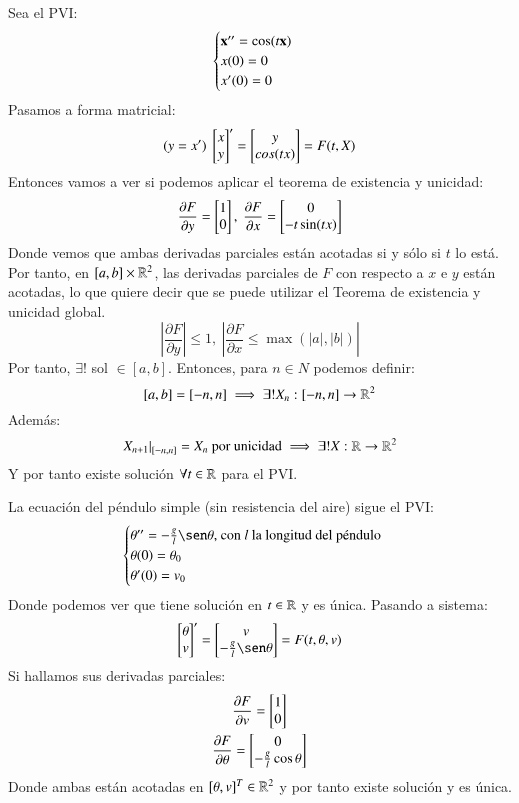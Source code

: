 \begin{eg}[Aplicación del teorema de existencia y unicidad en $\mbf{x}'' = \cos(t\mbf{x})$]
    Sea el PVI:
    $$
        \begin{cases}
            \mathbf{x''} = \cos(t\mathbf{x})\\
            x(0) = 0\\
            x'(0) = 0
        \end{cases}
    $$
    Pasamos a forma matricial:
    $$
        (y = x')\ \mx{x\\y}' = \mx{y\\ cos(tx)} = F(t, X)
    $$
    Entonces vamos a ver si podemos aplicar el teorema de existencia y unicidad:
    $$
        \frac{\partial F}{\partial y} = \mx{1\\0},\ \frac{\partial F}{\partial x} = \mx{0\\ -t\sin(tx)}
    $$
    Donde vemos que ambas derivadas parciales están acotadas si y sólo si $t$ lo está. Por tanto, en $[a, b] \times \mathbb{R}^2$, las derivadas parciales de $F$ con respecto a $x$ e $y$ están acotadas, lo que quiere decir que se puede utilizar el Teorema de existencia y unicidad global.
    $$
        \left| \frac{\partial F}{\partial y} \right| \leq 1,\ \left| \frac{\partial F}{\partial x} \leq \max(|a|, |b|)  \right|
    $$
    Por tanto, $\exists ! $ sol $ \in [a, b]$. Entonces, para $n \in N$ podemos definir:
    $$
        [a, b] = [-n, n] \implies \exists ! X_n: [-n, n] \to \mathbb{R}^2
    $$
    Además:
    $$
        \left. X_{n+1}\right|_{[-n, n]} = X_n \text{ por unicidad} \implies \exists ! X: \mathbb{R} \to \mathbb{R}^2
    $$
    Y por tanto existe solución $\forall t\in \mathbb{R}$ para el PVI.
\end{eg}
\begin{eg}
    La ecuación del péndulo simple (sin resistencia del aire) sigue el PVI:
    $$
        \begin{cases}
            \theta'' = -\frac{g}{l} \sen \theta\text{, con $l$ la longitud del péndulo}\\
            \theta(0) = \theta_0\\
            \theta'(0) = v_0
        \end{cases}
    $$
    Donde podemos ver que tiene solución en $t\in\mathbb{R}$ y es única. Pasando a sistema:
    $$
        \mx{\theta\\v}' = \mx{v\\-\frac{g}{l}\sen\theta} = F(t, \theta, v)
    $$
    Si hallamos sus derivadas parciales:
    \begin{gather*}
        \frac{\partial F}{\partial v} = \mx{1\\0}\\
        \frac{\partial F}{\partial \theta} = \mx{0\\-\frac{g}{l}\cos\theta}
    \end{gather*}
    Donde ambas están acotadas en $[\theta, v]^T\in\mathbb{R}^2$ y por tanto existe solución y es única.
\end{eg}
